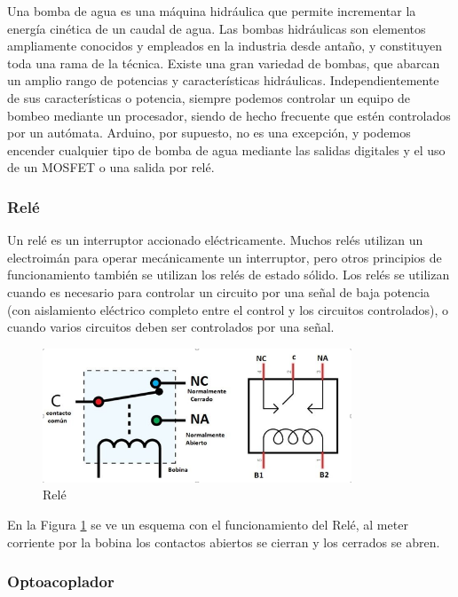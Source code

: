 \documentclass[a4paper]{article}
\begin{document}
Una bomba de agua es una máquina hidráulica que permite incrementar la energía cinética de un caudal de agua.
Las bombas hidráulicas son elementos ampliamente conocidos y empleados en la industria desde antaño, y constituyen toda una rama de la técnica. Existe una gran variedad de bombas, que abarcan un amplio rango de potencias y características hidráulicas.
Independientemente de sus características o potencia, siempre podemos controlar un equipo de bombeo mediante un procesador, siendo de hecho frecuente que estén controlados por un autómata. Arduino, por supuesto, no es una excepción, y podemos encender cualquier tipo de bomba de agua mediante las salidas digitales y el uso de un MOSFET o una salida por relé.

\subsubsection*{Relé}

Un relé es un interruptor accionado eléctricamente. Muchos relés utilizan un electroimán para operar mecánicamente un interruptor, pero otros principios de funcionamiento también se utilizan los relés de estado sólido. Los relés se utilizan cuando es necesario para controlar un circuito por una señal de baja potencia (con aislamiento eléctrico completo entre el control y los circuitos controlados), o cuando varios circuitos deben ser controlados por una señal.


\begin{figure}[h]\centering
    \includegraphics[height=4cm]{rele.png}
    \caption{Relé}
    \label{fig:Relé}
\end{figure}

En la Figura \ref{fig:Relé} se ve un esquema con el funcionamiento del Relé, al meter corriente por la bobina los contactos abiertos se cierran y los cerrados se abren.

\subsubsection*{Optoacoplador}
\end{document}
